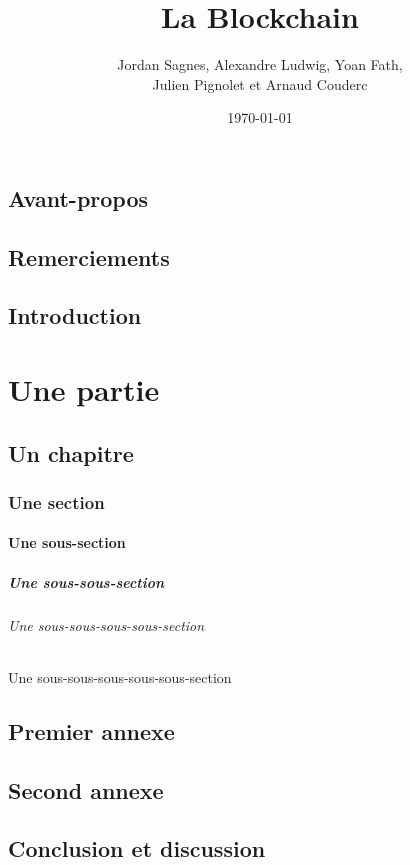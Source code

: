 \documentclass[12pt, a4paper, oneside]{book}
\title{La Blockchain}
\author{ Jordan Sagnes, Alexandre Ludwig, Yoan Fath, \\ Julien Pignolet et Arnaud Couderc}
\date{\today}
\begin{document}
 
\maketitle
 
    \frontmatter
 
    \chapter{Avant-propos}
    \chapter{Remerciements}
    \chapter{Introduction}
 
    \mainmatter
 
    \part{Une partie}
    \chapter{Un chapitre}
    \section{Une section}
    \subsection{Une sous-section}
    \subsubsection{Une sous-sous-section}
    \paragraph{Une sous-sous-sous-sous-section}
    \subparagraph{Une sous-sous-sous-sous-sous-section}
 
    \appendix
 
    \chapter{Premier annexe}
    \chapter{Second annexe}
 
    
    \backmatter
 
    \chapter{Conclusion et discussion}
 
    
    \tableofcontents    
    \listoffigures        %
    \listoftables        %
 
\end{document}
